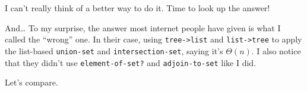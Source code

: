 \documentclass[final,fleqn,titlepage,twoside]{article}
\begin{document}
I can't really think of a better way to do it. Time to look up the answer!

And\ldots{} To my surprise, the answer most internet people have given is what I
called the ``wrong'' one. In their case, using \texttt{tree->list} and
\texttt{list->tree} to apply the list-based \texttt{union-set} and
\texttt{intersection-set}, saying it's \(\Theta(n)\). I also notice that they
didn't use \texttt{element-of-set?} and \texttt{adjoin-to-set} like I did.

Let's compare.
\end{document}
